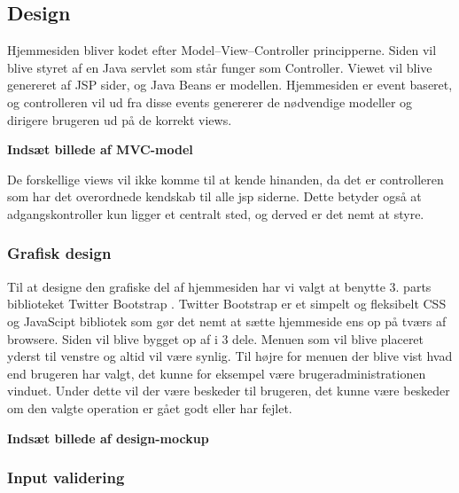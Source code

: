 \documentclass[a4paper]{article}
\begin{document}
\subsection{Design} %

Hjemmesiden bliver kodet efter Model–View–Controller principperne. Siden vil blive styret af en Java servlet som står funger som Controller. Viewet vil blive genereret af JSP sider, og Java Beans er modellen.  Hjemmesiden er event baseret, og controlleren vil ud fra disse events genererer de nødvendige modeller og dirigere brugeren ud på de korrekt views.

\begin{center}
  \textbf{Indsæt billede af MVC-model}
\end{center}

De forskellige views vil ikke komme til at kende hinanden, da det er controlleren som har det overordnede kendskab til alle jsp siderne. Dette betyder også at adgangskontroller kun ligger et centralt sted, og derved er det nemt at styre.

\subsubsection{Grafisk design} %

Til at designe den grafiske del af hjemmesiden har vi valgt at benytte 3. parts biblioteket Twitter Bootstrap .  Twitter Bootstrap er et simpelt og fleksibelt CSS og JavaScipt bibliotek som gør det nemt at sætte hjemmeside ens op på tværs af browsere. Siden vil blive bygget op af i 3 dele. Menuen som vil blive placeret yderst til venstre og altid vil være synlig. Til højre for menuen der blive vist hvad end brugeren har valgt, det kunne for eksempel være brugeradministrationen vinduet. Under dette vil der være beskeder til brugeren, det kunne være beskeder om den valgte operation er gået godt eller har fejlet.

\begin{center}
  \textbf{Indsæt billede af design-mockup}
\end{center}


\subsubsection{Input validering} %
\end{document}
